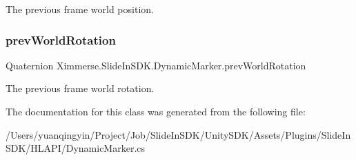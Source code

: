 The previous frame world position. 

\mbox{\label{class_ximmerse_1_1_slide_in_s_d_k_1_1_dynamic_marker_a9bffffd77f8b8eac9fac3070053e4903}} 
\subsubsection{\texorpdfstring{prev\+World\+Rotation}{prevWorldRotation}}
{\footnotesize\ttfamily Quaternion Ximmerse.\+Slide\+In\+S\+D\+K.\+Dynamic\+Marker.\+prev\+World\+Rotation\hspace{0.3cm}{\ttfamily [protected]}}



The previous frame world rotation. 



The documentation for this class was generated from the following file\+:\begin{DoxyCompactItemize}
\item 
/\+Users/yuanqingyin/\+Project/\+Job/\+Slide\+In\+S\+D\+K/\+Unity\+S\+D\+K/\+Assets/\+Plugins/\+Slide\+In\+S\+D\+K/\+H\+L\+A\+P\+I/Dynamic\+Marker.\+cs\end{DoxyCompactItemize}
